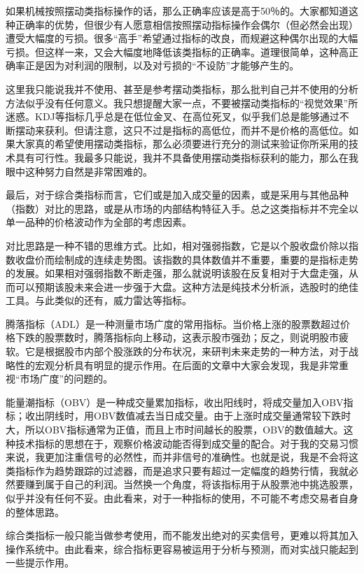 如果机械按照摆动类指标操作的话，那么正确率应该是高于50％的。大家都知道这种正确率的优势，但很少有人愿意相信按照摆动指标操作会偶尔（但必然会出现）遭受大幅度的亏损。很多“高手”希望通过指标的改良，而规避这种偶尔出现的大幅亏损。但这样一来，又会大幅度地降低该类指标的正确率。道理很简单，这种高正确率正是因为对利润的限制，以及对亏损的“不设防”才能够产生的。

这里我只能说我并不使用、甚至是参考摆动类指标，那么批判自己并不使用的分析方法似乎没有任何意义。我只想提醒大家一点，不要被摆动类指标的“视觉效果”所迷惑。KDJ等指标几乎总是在低位金叉、在高位死叉，似乎我们总是能够通过不断摆动来获利。但请注意，这只不过是指标的高低位，而并不是价格的高低位。如果大家真的希望使用摆动类指标，那么必须要进行充分的测试来验证你所采用的技术具有可行性。我最多只能说，我并不具备使用摆动类指标获利的能力，那么在我眼中这种努力自然是非常困难的。

最后，对于综合类指标而言，它们或是加入成交量的因素，或是采用与其他品种（指数）对比的思路，或是从市场的内部结构特征入手。总之这类指标并不完全以单一品种的价格波动作为全部的考虑因素。

对比思路是一种不错的思维方式。比如，相对强弱指数，它是以个股收盘价除以指数收盘价而绘制成的连续走势图。该指数的具体数值并不重要，重要的是指标走势的发展。如果相对强弱指数不断走强，那么就说明该股在反复相对于大盘走强，从而可以预期该股未来会进一步强于大盘。这种方法是纯技术分析派，选股时的绝佳工具。与此类似的还有，威力雷达等指标。

腾落指标（ADL）是一种测量市场广度的常用指标。当价格上涨的股票数超过价格下跌的股票数时，腾落指标向上移动，这表示股市强劲；反之，则说明股市疲软。它是根据股市内部个股涨跌的分布状况，来研判未来走势的一种方法，对于战略性的宏观分析具有明显的提示作用。在后面的文章中大家会发现，我是非常重视“市场广度”的问题的。

能量潮指标（OBV）是一种成交量累加指标，收出阳线时，将成交量加入OBV指标；收出阴线时，用OBV数值减去当日成交量。由于上涨时成交量通常较下跌时大，所以OBV指标通常为正值，而且上市时间越长的股票，OBV的数值越大。这种技术指标的思想在于，观察价格波动能否得到成交量的配合。对于我的交易习惯来说，我更加注重信号的必然性，而并非信号的准确性。也就是说，我是不会将这类指标作为趋势跟踪的过滤器，而是追求只要有超过一定幅度的趋势行情，我就必然要赚到属于自己的利润。当然换一个角度，将该指标用于从股票池中挑选股票，似乎并没有任何不妥。由此看来，对于一种指标的使用，不可能不考虑交易者自身的整体思路。

综合类指标一般只能当做参考使用，而不能发出绝对的买卖信号，更难以将其加入操作系统中。由此看来，综合指标更容易被运用于分析与预测，而对实战只能起到一些提示作用。

